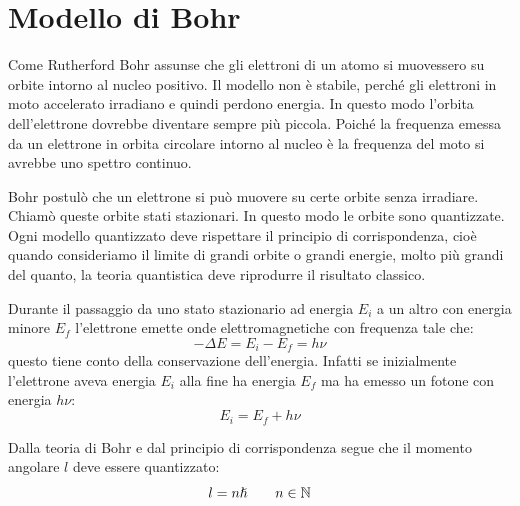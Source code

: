 \section{Modello di Bohr}
Come Rutherford Bohr assunse che gli elettroni di un atomo si muovessero su orbite intorno al nucleo positivo. Il modello non è stabile, perché gli elettroni in moto accelerato irradiano e quindi perdono energia. In questo modo l'orbita dell'elettrone dovrebbe diventare sempre più piccola. Poiché la frequenza emessa da un elettrone in orbita circolare intorno al nucleo è la frequenza del moto si avrebbe uno spettro continuo.

Bohr postulò che un elettrone si può muovere su certe orbite senza irradiare. Chiamò queste orbite stati stazionari. In questo modo le orbite sono quantizzate. Ogni modello quantizzato deve rispettare il principio di corrispondenza, cioè quando consideriamo il limite di grandi orbite o grandi energie, molto più grandi del quanto, la teoria quantistica deve riprodurre il risultato classico.

Durante il passaggio da uno stato stazionario ad energia $E_i$ a un altro con energia minore $E_f$ l'elettrone emette onde elettromagnetiche con frequenza tale che:
\begin{equation}
	-\Delta E = E_i-E_f=h\nu
\end{equation}
questo tiene conto della conservazione dell'energia. Infatti se inizialmente l'elettrone aveva energia $E_i$ alla fine ha energia $E_f$ ma ha emesso un fotone con energia $h\nu$:
\begin{equation}
	E_i=E_f+h\nu
\end{equation}

Dalla teoria di Bohr e dal principio di corrispondenza segue che il momento angolare $l$ deve essere quantizzato:
\begin{equation}
	l=n\hslash\qquad n\in\mathbb{N}
\end{equation}

